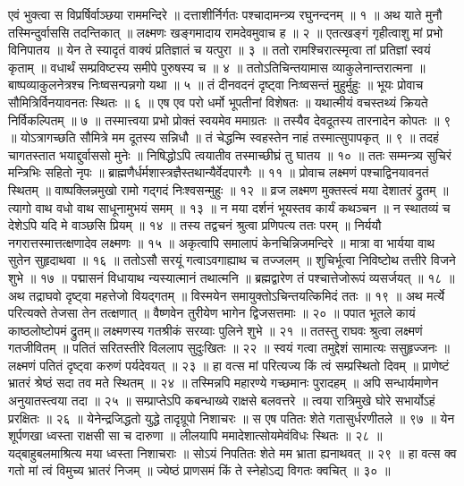 एवं भुक्त्वा स विप्रर्षिर्वाञ्छया राममन्दिरे ॥
दत्ताशीर्निर्गतः पश्चादामन्त्र्य रघुनन्दनम् ॥ १ ॥
अथ याते मुनौ तस्मिन्दुर्वाससि तदन्तिकात् ॥
लक्ष्मणः खङ्गमादाय रामदेवमुवाच ह ॥ २ ॥
एतत्खङ्गं गृहीत्वाशु मां प्रभो विनिपातय ॥
येन ते स्यादृतं वाक्यं प्रतिज्ञातं च यत्पुरा ॥ ३ ॥
ततो रामश्चिरात्स्मृत्वा तां प्रतिज्ञां स्वयं कृताम् ॥
वधार्थं सम्प्रविष्टस्य समीपे पुरुषस्य च ॥ ४ ॥
ततोऽतिचिन्तयामास व्याकुलेनान्तरात्मना ॥
बाष्पव्याकुलनेत्रश्च निःष्वसन्पन्नगो यथा ॥ ५ ॥
तं दीनवदनं दृष्ट्वा निःष्वसन्तं मुहुर्मुहुः ॥
भूयः प्रोवाच सौमित्रिर्विनयावनतः स्थितः ॥ ६ ॥
एष एव परो धर्मो भूपतीनां विशेषतः ॥
यथात्मीयं वचस्तथ्यं क्रियते निर्विकल्पितम् ॥ ७ ॥
तस्मात्त्वया प्रभो प्रोक्तं स्वयमेव ममाग्रतः ॥
तस्यैव देवदूतस्य तारनादेन कोपतः ॥ ९ ॥
योऽत्रागच्छति सौमित्रे मम दूतस्य सन्निधौ ॥
तं चेद्धन्मि स्वहस्तेन नाहं तस्मात्सुपापकृत् ॥ ९ ॥
तदहं चागतस्तात भयाद्दुर्वाससो मुनेः ॥
निषिद्धोऽपि त्वयातीव तस्माच्छीघ्रं तु घातय ॥ १० ॥
ततः सम्मन्त्र्य सुचिरं मन्त्रिभिः सहितो नृपः ॥
ब्राह्मणैर्धर्मशास्त्रज्ञैस्तथान्यैर्वेदपारगैः ॥ ११ ॥
प्रोवाच लक्ष्मणं पश्चाद्विनयावनतं स्थितम् ॥
वाष्पक्लिन्नमुखो रामो गद्गदं निःश्वसन्मुहुः ॥ १२ ॥
व्रज लक्ष्मण मुक्तस्त्वं मया देशातरं द्रुतम् ॥
त्यागो वाथ वधो वाथ साधूनामुभयं समम् ॥ १३ ॥
न मया दर्शनं भूयस्तव कार्यं कथञ्चन ॥
न स्थातव्यं च देशेऽपि यदि मे वाञ्छसि प्रियम् ॥ १४ ॥
तस्य तद्वचनं श्रुत्वा प्रणिपत्य ततः परम् ॥
निर्ययौ नगरात्तस्मात्तत्क्षणादेव लक्ष्मणः ॥ १५ ॥
अकृत्वापि समालापं केनचिन्निजमन्दिरे ॥
मात्रा वा भार्यया वाथ सुतेन सुहृदाथवा ॥ १६ ॥
ततोऽसौ सरयूं गत्वाऽवगाह्याथ च तज्जलम् ॥
शुचिर्भूत्वा निविष्टोथ तत्तीरे विजने शुभे ॥ १७ ॥
पद्मासनं विधायाथ न्यस्यात्मानं तथात्मनि ॥
ब्रह्मद्वारेण तं पश्चात्तेजोरूपं व्यसर्जयत् ॥ १८ ॥
अथ तद्राघवो दृष्ट्वा महत्तेजो वियद्गतम् ॥
विस्मयेन समायुक्तोऽचिन्तयत्किमिदं ततः ॥ १९ ॥
अथ मर्त्ये परित्यक्ते तेजसा तेन तत्क्षणात् ॥
वैष्णवेन तुरीयेण भागेन द्विजसत्तमाः ॥ २० ॥
पपात भूतले कायं काष्ठलोष्टोपमं द्रुतम्॥
लक्ष्मणस्य गतश्रीकं सरय्वाः पुलिने शुभे ॥ २१ ॥
ततस्तु राघवः श्रुत्वा लक्ष्मणं गतजीवितम् ॥
पतितं सरितस्तीरे विललाप सुदुःखितः ॥ २२ ॥
स्वयं गत्वा तमुद्देशं सामात्यः ससुहृज्जनः ॥
लक्ष्मणं पतितं दृष्ट्वा करुणं पर्यदेवयत् ॥ २३ ॥
हा वत्स मां परित्यज्य किं त्वं सम्प्रस्थितो दिवम् ॥
प्राणेष्टं भ्रातरं श्रेष्ठं सदा तव मते स्थितम् ॥ २४ ॥
तस्मिन्नपि महारण्ये गच्छमानः पुरादहम् ॥
अपि सन्धार्यमाणेन अनुयातस्त्वया तदा ॥ २५ ॥
सम्प्राप्तेऽपि कबन्धाख्ये राक्षसे बलवत्तरे ॥
त्वया रात्रिमुखे घोरे सभार्योऽहं प्ररक्षितः ॥ २६ ॥
येनेन्द्रजिद्धतो युद्धे तादृग्रूपो निशाचरः ॥
स एष पतितः शेते गतासुर्धरणीतले ॥ ९७ ॥
येन शूर्पणखा ध्वस्ता राक्षसी सा च दारुणा ॥
लीलयापि ममादेशात्सोयमेवंविधः स्थितः ॥ २८ ॥
यद्बाहुबलमाश्रित्य मया ध्वस्ता निशाचराः ॥
सोऽयं निपतितः शेते मम भ्राता ह्यनाथवत् ॥ २९ ॥
हा वत्स क्व गतो मां त्वं विमुच्य भ्रातरं निजम् ॥
ज्येष्ठं प्राणसमं किं ते स्नेहोऽद्य विगतः क्वचित् ॥ ३० ॥

